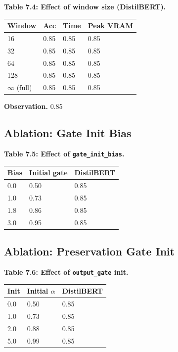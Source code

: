 \textbf{Table 7.4: Effect of window size (DistilBERT).}

\begin{table}[H]
\centering
\small
\begin{tabular}{llll}
\toprule
\textbf{Window} & \textbf{Acc} & \textbf{Time} & \textbf{Peak VRAM} \\
\midrule
16 & 0.85 & 0.85 & 0.85 \\
32 & 0.85 & 0.85 & 0.85 \\
64 & 0.85 & 0.85 & 0.85 \\
128 & 0.85 & 0.85 & 0.85 \\
$\infty$ (full) & 0.85 & 0.85 & 0.85 \\
\bottomrule
\end{tabular}
\end{table}

\textbf{Observation.} 0.85

\subsection{Ablation: Gate Init Bias}

\textbf{Table 7.5: Effect of \texttt{gate\_init\_bias}.}

\begin{table}[H]
\centering
\small
\begin{tabular}{lll}
\toprule
\textbf{Bias} & \textbf{Initial gate} & \textbf{DistilBERT} \\
\midrule
0.0 & 0.50 & 0.85 \\
1.0 & 0.73 & 0.85 \\
1.8 & 0.86 & 0.85 \\
3.0 & 0.95 & 0.85 \\
\bottomrule
\end{tabular}
\end{table}

\subsection{Ablation: Preservation Gate Init}

\textbf{Table 7.6: Effect of \texttt{output\_gate} init.}

\begin{table}[H]
\centering
\small
\begin{tabular}{lll}
\toprule
\textbf{Init} & \textbf{Initial $\alpha$} & \textbf{DistilBERT} \\
\midrule
0.0 & 0.50 & 0.85 \\
1.0 & 0.73 & 0.85 \\
2.0 & 0.88 & 0.85 \\
5.0 & 0.99 & 0.85 \\
\bottomrule
\end{tabular}
\end{table}

